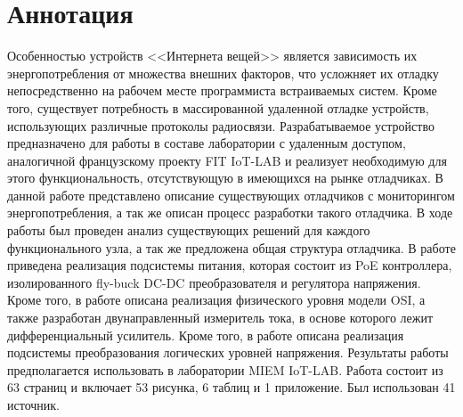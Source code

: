 
\chapter*{Аннотация}
\hspace{1cm} 

Особенностью устройств <<Интернета вещей>> является зависимость их энергопотребления от множества 
внешних факторов, что усложняет их отладку непосредственно на рабочем месте программиста 
встраиваемых систем. Кроме того, существует потребность в массированной удаленной отладке устройств, 
использующих различные протоколы радиосвязи. Разрабатываемое устройство предназначено для работы в 
составе лаборатории с удаленным доступом, аналогичной французскому проекту FIT IoT-LAB и реализует 
необходимую для этого функциональность, отсутствующую в имеющихся на рынке отладчиках.
В данной работе представлено описание существующих отладчиков с мониторингом энергопотребления, 
а так же описан процесс разработки такого отладчика. В ходе работы был проведен анализ существующих 
решений для каждого функционального узла, а так же предложена общая структура отладчика. В работе
приведена реализация подсистемы питания, которая состоит из PoE контроллера, изолированного fly-buck
DC-DC преобразователя и регулятора напряжения. Кроме того, в работе описана реализация физического 
уровня модели OSI, а также разработан двунаправленный измеритель тока, в основе которого 
лежит дифференциальный усилитель. Кроме того, в работе описана реализация подсистемы преобразования 
логических уровней напряжения. Результаты работы предполагается использовать в лаборатории 
MIEM IoT-LAB. Работа состоит из 63 страниц и включает 53 рисунка, 6 таблиц и 1 приложение.
Был использован 41 источник.


